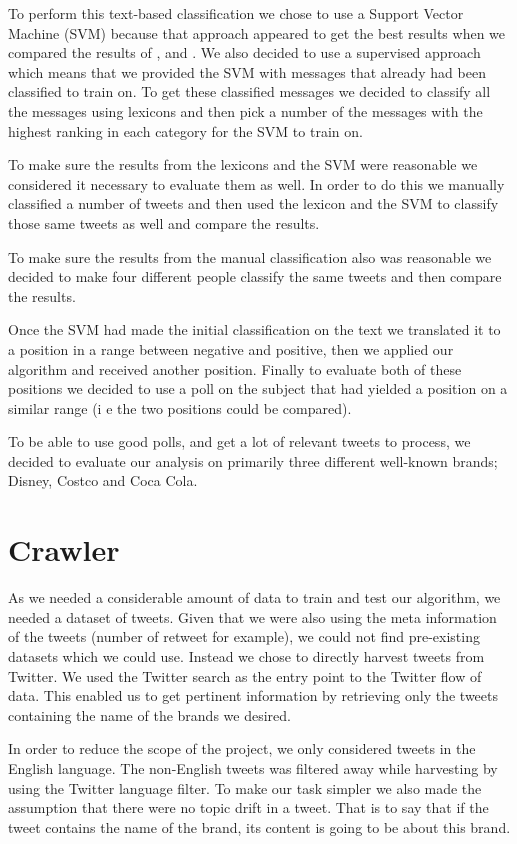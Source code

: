 \documentclass[a4paper,12pt]{report}
\begin{document}
To perform this text-based classification we chose to use a Support Vector Machine (SVM) because that approach appeared to get the best results when we compared the results of \cite{Pang02}, \cite{Turney02} and \cite{Taboada10}.
We also decided to use a supervised approach which means that we provided the SVM with messages that already had been classified to train on.
To get these classified messages we decided to classify all the messages using lexicons and then pick a number of the messages with the highest ranking in each category for the SVM to train on.

To make sure the results from the lexicons and the SVM were reasonable we considered it necessary to evaluate them as well. 
In order to do this we manually classified a number of tweets and then used the lexicon and the SVM to classify those same tweets as well and compare the results.

To make sure the results from the manual classification also was reasonable we decided to make four different people classify the same tweets and then compare the results.

Once the SVM had made the initial classification on the text we translated it to a position in a range between negative and positive, then we applied our algorithm and received another position. Finally to evaluate both of these positions we decided to use a poll on the subject that had yielded a position on a similar range (i e the two positions could be compared).

To be able to use good polls, and get a lot of relevant tweets to process, we decided to evaluate our analysis on primarily three different well-known brands; Disney, Costco and Coca Cola.

\section{Crawler}

As we needed a considerable amount of data to train and test our algorithm, we needed a dataset of tweets. 
Given that we were also using the meta information of the tweets (number of retweet for example), we could not find pre-existing datasets which we could use.
Instead we chose to directly harvest tweets from Twitter.
We used the Twitter search as the entry point to the Twitter flow of data. 
This enabled us to get pertinent information by retrieving only the tweets containing the name of the brands we desired.

In order to reduce the scope of the project, we only considered tweets in the English language. 
The non-English tweets was filtered away while harvesting by using the Twitter language filter.
To make our task simpler we also made the assumption that there were no topic drift in a tweet. 
That is to say that if the tweet contains the name of the brand, its content is going to be about this brand.
\end{document}
